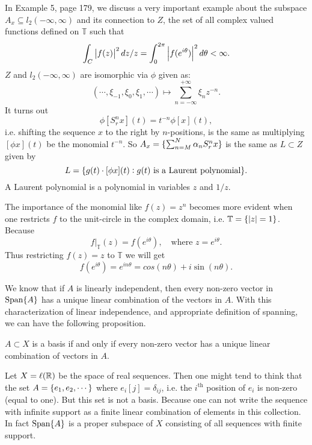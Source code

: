  
 \begin{summary}
 	In Example 5, page 179, we discuss a very important example about the subspace $ A_x \subseteq l_2(-\infty,\infty) $ and its connection to $ Z $, the set of all complex valued functions defined on $ \mathbb{T} $ such that 
 	\[ \int_C \left|f(z)\right|^2 dz/z = \int_{0}^{2\pi} \left|f(e^{i\theta})\right|^2d\theta < \infty. \]
 	$ Z $ and $ l_2(-\infty,\infty) $ are isomorphic via $ \phi $ given as:
 	\[ (\cdots,\xi_{-1}, \xi_{0},\xi_{1},\cdots) \mapsto \sum_{n=-\infty}^{+\infty} \xi_n z^{-n}. \]
 	It turns out
 	\[ \phi[S_r^n x](t) = t^{-n} \phi[x](t), \]
 	i.e. shifting the sequence $ x $ to the right by $ n $-positions, is the same as multiplying $ [\phi x](t) $ be the monomial $ t^{-n} $. So $ A_x = \{\sum_{n=M}^{N}\alpha_n S_r^n x\} $ is the same as $ L\subset Z $ given by
 	\[ L = \{g(t)\cdot [\phi x](t): g(t)\text{ is a Laurent polynomial}\}. \]
 	A Laurent polynomial is a polynomial in variables $ z $ and $ 1/z $.
 	
 	\begin{remark}
 		 The importance of the monomial like $ f(z) = z^n $ becomes more evident when one restricts $ f $ to the unit-circle in the complex domain, i.e. $ \mathbb{T} = \{\left|z\right|=1\} $. Because
 		 \[ f\big|_{\mathbb{T}}(z) = f(e^{i\theta}), \quad \text{where }z=e^{i\theta}. \]
 		 Thus restricting $ f(z)=z $ to $ \mathbb{T} $ we will get
 		 \[ f(e^{i\theta}) = e^{in\theta} = cos(n\theta) + i\sin(n\theta). \]
 	\end{remark}

 \end{summary}
 
 \begin{summary}
 	We know that if $ A $ is linearly independent, then every non-zero vector in $ \operatorname{Span}\{A\} $ has a unique linear combination of the vectors in $ A $. With this characterization of linear independence, and appropriate definition of spanning, we can have the following proposition.
 	\begin{proposition}
 		$ A\subset X $ is a basis if and only if every non-zero vector has a unique linear combination of vectors in $ A $.
 	\end{proposition}
 \end{summary}
 
 \begin{summary}
 	Let $ X = \ell(\mathbb{R}) $ be the space of real sequences. Then one might tend to think that the set $ A = \{e_1, e_2,\cdots\} $ where $ e_i[j]=\delta_{ij} $, i.e. the $ i^\text{th} $ position of $ e_i $  is non-zero (equal to one). But this set is not a basis. Because one can not write the sequence with infinite support as a finite linear combination of elements in this collection. In fact $ \operatorname{Span}\{A\} $ is a proper subspace of $ X $ consisting of all sequences with finite support.
 \end{summary}
 
